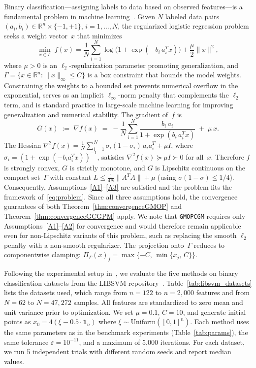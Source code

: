 \documentclass{article}
\theoremstyle{plain}
\theoremstyle{definition}
\theoremstyle{remark}
\newcommand{\R}{\mathbb{R}}
\newcommand{\norm}[1]{\|#1\|}
\newcommand{\PG}{\Pi_{\Gamma}}
\newcommand{\algoname}[1]{{\small\texttt{#1}}}
\newcommand{\GMOPCGM}{\algoname{GMOPCGM}}
\begin{document}
Binary classification---assigning labels to data based on observed features---is a fundamental problem in machine learning~\cite{chang2011libsvm}. Given $N$ labeled data pairs $(a_i, b_i) \in \R^n \times \{-1,+1\}$, $i = 1,\ldots,N$, the regularized logistic regression problem seeks a weight vector~$x$ that minimizes
\begin{equation}\label{eq:logreg}
  \min_{x \in \Gamma}\; f(x) = \frac{1}{N}\sum_{i=1}^{N}
  \log\!\bigl(1 + \exp(-b_i\,a_i^T x)\bigr) + \frac{\mu}{2}\norm{x}^2,
\end{equation}
where $\mu > 0$ is an $\ell_2$-regularization parameter promoting generalization, and $\Gamma = \{x \in \R^n : \norm{x}_\infty \leq C\}$ is a box constraint that bounds the model weights. Constraining the weights to a bounded set prevents numerical overflow in the exponential, serves as an implicit $\ell_\infty$-norm penalty that complements the $\ell_2$ term, and is standard practice in large-scale machine learning for improving generalization and numerical stability. The gradient of~$f$ is
\begin{equation}\label{eq:logreg_grad}
  G(x) \;:=\; \nabla f(x) \;=\; -\frac{1}{N}\sum_{i=1}^{N}
  \frac{b_i\,a_i}{1 + \exp(b_i\,a_i^T x)} \;+\; \mu\, x.
\end{equation}
The Hessian $\nabla^2 f(x) = \frac{1}{N}\sum_{i=1}^N \sigma_i(1 - \sigma_i)\,a_i a_i^T + \mu I$, where $\sigma_i = (1 + \exp(-b_i a_i^T x))^{-1}$, satisfies $\nabla^2 f(x) \succeq \mu I \succ 0$ for all~$x$. Therefore $f$ is strongly convex, $G$ is strictly monotone, and $G$ is Lipschitz continuous on the compact set~$\Gamma$ with constant $L \leq \frac{1}{4N}\norm{A^TA} + \mu$ (using $\sigma(1-\sigma) \leq 1/4$). Consequently, Assumptions~\ref{A1}--\ref{A3} are satisfied and the problem fits the framework of~\eqref{eq:problem}. Since all three assumptions hold, the convergence guarantees of both Theorem~\ref{thm:convergenceGMOP} and Theorem~\ref{thm:convergenceGCGPM} apply. We note that \GMOPCGM{} requires only Assumptions~\ref{A1}--\ref{A2} for convergence and would therefore remain applicable even for non-Lipschitz variants of this problem, such as replacing the smooth $\ell_2$ penalty with a non-smooth regularizer. The projection onto~$\Gamma$ reduces to componentwise clamping: $\PG(x)_j = \max\{-C,\, \min\{x_j,\, C\}\}$.

Following the experimental setup in~\cite{ibrahim2025relaxed}, we evaluate the five methods on binary classification datasets from the LIBSVM repository~\cite{chang2011libsvm}. Table~\ref{tab:libsvm_datasets} lists the datasets used, which range from $n = 122$ to $n = 2{,}000$ features and from $N = 62$ to $N = 47{,}272$ samples. All features are standardized to zero mean and unit variance prior to optimization. We set $\mu = 0.1$, $C = 10$, and generate initial points as $x_0 = 4(\xi - 0.5\cdot\mathbf{1}_n)$ where $\xi \sim \mathrm{Uniform}([0,1]^n)$. Each method uses the same parameters as in the benchmark experiments (Table~\ref{tab:params}), the same tolerance $\varepsilon = 10^{-11}$, and a maximum of 5{,}000 iterations. For each dataset, we run 5 independent trials with different random seeds and report median values.
\end{document}
